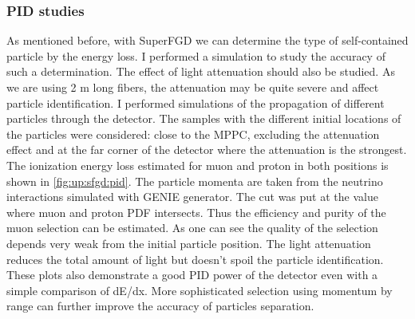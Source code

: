 \documentclass[main.tex]{subfiles}
\begin{document}
\subsubsection{PID studies}
As mentioned before, with SuperFGD we can determine the type of self-contained particle by the energy loss. I performed a simulation to study the accuracy of such a determination. The effect of light attenuation should also be studied. As we are using 2 m long fibers, the attenuation may be quite severe and affect particle identification. I performed simulations of the propagation of different particles through the detector. The samples with the different initial locations of the particles were considered: close to the MPPC, excluding the attenuation effect and at the far corner of the detector where the attenuation is the strongest. The ionization energy loss estimated for muon and proton in both positions is shown in \autoref{fig:up:sfgd:pid}. The particle momenta are taken from the neutrino interactions simulated with GENIE generator. The cut was put at the value where muon and proton PDF intersects. Thus the efficiency and purity of the muon selection can be estimated. As one can see the quality of the selection depends very weak from the initial particle position. The light attenuation reduces the total amount of light but doesn't spoil the particle identification. These plots also demonstrate a good PID power of the detector even with a simple comparison of dE/dx. More sophisticated selection using momentum by range can further improve the accuracy of particles separation.
\end{document}
